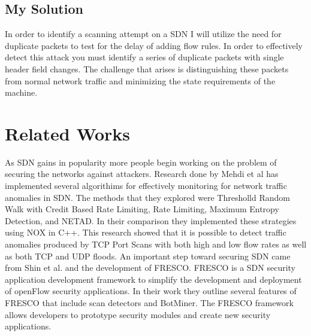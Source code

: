 \documentclass[twocolumn]{article}
\begin{document}
\subsection{My Solution}

In order to identify a scanning attempt on a SDN I will utilize the need for duplicate packets to test for the delay of adding flow rules. In order to effectively detect this attack you must identify a series of duplicate packets with single header field changes. The challenge that arises is distinguishing these packets from normal network traffic and minimizing the state requirements of the machine. 

\section{Related Works}

As SDN gains in popularity more people begin working on the problem of securing the networks against attackers. Research done by Mehdi et al \cite{mehdi13} has implemented several algorithims for effectively monitoring for network traffic anomalies in SDN. The methods that they explored were Thresholld Random Walk with Credit Based Rate Limiting, Rate Limiting, Maximum Entropy Detection, and NETAD. In their comparison they implemented these strategies using NOX in C++. This research showed that it is possible to detect traffic anomalies produced by TCP Port Scans with both high and low flow rates as well as both TCP and UDP floods. An important step toward securing SDN came from Shin et al. \cite{FRESCO} and the development of FRESCO. FRESCO is a SDN security application development framework to simplify the development and deployment of openFlow security applications. In their work they outline several features of FRESCO that include scan detectors and BotMiner. The FRESCO framework allows developers to prototype security modules and create new security applications. 




\end{document}
